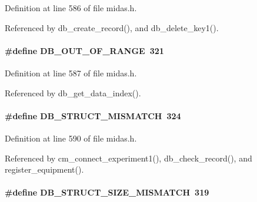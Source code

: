 Definition at line 586 of file midas.h.

Referenced by db\_\-create\_\-record(), and db\_\-delete\_\-key1().
\paragraph[{DB\_\-OUT\_\-OF\_\-RANGE}]{\setlength{\rightskip}{0pt plus 5cm}\#define DB\_\-OUT\_\-OF\_\-RANGE~321}\hfill\label{group__err23_ga1043c6971ce0fc8cc5613ec81e315789}

\begin{DoxyItemize}
\item 
\end{DoxyItemize}

Definition at line 587 of file midas.h.

Referenced by db\_\-get\_\-data\_\-index().
\paragraph[{DB\_\-STRUCT\_\-MISMATCH}]{\setlength{\rightskip}{0pt plus 5cm}\#define DB\_\-STRUCT\_\-MISMATCH~324}\hfill\label{group__err23_ga0ee271607cfbec2e6050b0ea6e5ef533}

\begin{DoxyItemize}
\item 
\end{DoxyItemize}

Definition at line 590 of file midas.h.

Referenced by cm\_\-connect\_\-experiment1(), db\_\-check\_\-record(), and register\_\-equipment().
\paragraph[{DB\_\-STRUCT\_\-SIZE\_\-MISMATCH}]{\setlength{\rightskip}{0pt plus 5cm}\#define DB\_\-STRUCT\_\-SIZE\_\-MISMATCH~319}\hfill\label{group__err23_ga920c5c179829999cc9b35cec855c7aec}

\begin{DoxyItemize}
\item 
\end{DoxyItemize}

